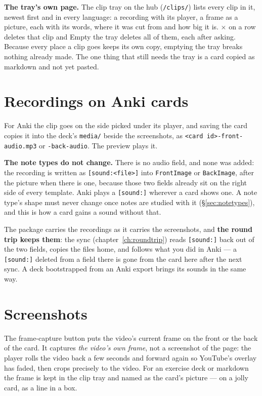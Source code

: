 \documentclass[11pt,oneside]{report}
\newcommand{\file}[1]{\texttt{#1}}
\newcommand{\menu}[1]{\textsf{#1}}
\begin{document}
\textbf{The tray's own page.} \menu{The clip tray} on the hub
(\texttt{/clips/}) lists every clip in it, newest first and in every
language: a recording with its player, a frame as a picture, each with its
words, where it was cut from and how big it is. \menu{$\times$} on a row
deletes that clip and \menu{Empty the tray} deletes all of them, each after
asking. Because every place a clip goes keeps its own copy, emptying the
tray breaks nothing already made. The one thing that still needs the tray
is a card copied as markdown and not yet pasted.

\section{Recordings on Anki cards}
\label{sec:ankisound}

For Anki the clip goes on the side picked under its player, and saving the
card copies it into the deck's \file{media/} beside the screenshots, as
\file{<card id>-front-audio.mp3} or \file{-back-audio}. The preview plays
it.

\textbf{The note types do not change.} There is no audio field, and none was
added: the recording is written as \texttt{[sound:<file>]} into
\texttt{FrontImage} or \texttt{BackImage}, after the picture when there is
one, because those two fields already sit on the right side of every
template. Anki plays a \texttt{[sound:]} wherever a card shows one. A note
type's shape must never change once notes are studied with it
(\S\ref{sec:notetypes}), and this is how a card gains a sound without that.

The package carries the recordings as it carries the screenshots, and
\textbf{the round trip keeps them}: the sync
(chapter~\ref{ch:roundtrip}) reads \texttt{[sound:]} back out of the two
fields, copies the files home, and follows what you did in Anki --- a
\texttt{[sound:]} deleted from a field there is gone from the card here
after the next sync. A deck bootstrapped from an Anki export brings its
sounds in the same way.

\section{Screenshots}
\label{sec:frames}

The frame-capture button puts the video's current frame on the front or the
back of the card. It captures \emph{the video's own frame}, not a screenshot
of the page: the player rolls the video back a few seconds and forward again
so YouTube's overlay has faded, then crops precisely to the video. For an
exercise deck or markdown the frame is kept in the clip tray and named as
the card's picture --- on a jolly card, as a line in a box.
\end{document}
